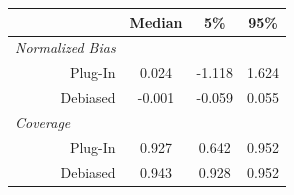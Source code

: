 \begin{tabular}[t]{r|ccc}
\toprule
 & Median & 5\% & 95\%\\
\midrule
\multicolumn{1}{l|}{\textit{Normalized Bias}}\\
Plug-In & 0.024 & -1.118 & 1.624\\
Debiased & -0.001 & -0.059 & 0.055\\
\midrule
\multicolumn{1}{l|}{\textit{Coverage}}\\
Plug-In & 0.927 & 0.642 & 0.952\\
Debiased & 0.943 & 0.928 & 0.952\\
\bottomrule
\end{tabular}
